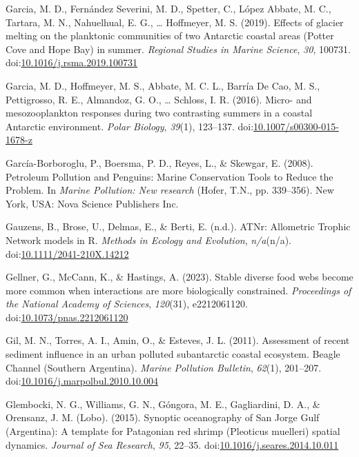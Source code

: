 \documentclass[
]{article}
\newlength{\cslhangindent}
\newlength{\cslentryspacingunit} %
\newenvironment{CSLReferences}[2] %
 {%
  \setlength{\parindent}{0pt}
  \ifodd #1
  \let\oldpar\par
  \def\par{\hangindent=\cslhangindent\oldpar}
  \fi
  \setlength{\parskip}{#2\cslentryspacingunit}
 }%
 {}
\begin{document}
\begin{CSLReferences}{1}{0}
\leavevmode{}%
Garcia, M. D., Fernández Severini, M. D., Spetter, C., López Abbate, M.
C., Tartara, M. N., Nahuelhual, E. G., \ldots{} Hoffmeyer, M. S. (2019).
Effects of glacier melting on the planktonic communities of two
{Antarctic} coastal areas ({Potter Cove} and {Hope Bay}) in summer.
\emph{Regional Studies in Marine Science}, \emph{30}, 100731.
doi:\href{https://doi.org/10.1016/j.rsma.2019.100731}{10.1016/j.rsma.2019.100731}

\leavevmode{}%
Garcia, M. D., Hoffmeyer, M. S., Abbate, M. C. L., Barría De Cao, M. S.,
Pettigrosso, R. E., Almandoz, G. O., \ldots{} Schloss, I. R. (2016).
Micro- and mesozooplankton responses during two contrasting summers in a
coastal {Antarctic} environment. \emph{Polar Biology}, \emph{39}(1),
123--137.
doi:\href{https://doi.org/10.1007/s00300-015-1678-z}{10.1007/s00300-015-1678-z}

\leavevmode{}%
García-Borboroglu, P., Boersma, P. D., Reyes, L., \& Skewgar, E. (2008).
Petroleum {Pollution} and {Penguins}: {Marine Conservation Tools} to
{Reduce} the {Problem}. In \emph{Marine {Pollution}: {New} research}
(Hofer, T.N., pp. 339--356). {New York, USA}: {Nova Science Publishers
Inc.}

\leavevmode{}%
Gauzens, B., Brose, U., Delmas, E., \& Berti, E. (n.d.). {ATNr}:
{Allometric Trophic Network} models in {R}. \emph{Methods in Ecology and
Evolution}, \emph{n/a}(n/a).
doi:\href{https://doi.org/10.1111/2041-210X.14212}{10.1111/2041-210X.14212}

\leavevmode{}%
Gellner, G., McCann, K., \& Hastings, A. (2023). Stable diverse food
webs become more common when interactions are more biologically
constrained. \emph{Proceedings of the National Academy of Sciences},
\emph{120}(31), e2212061120.
doi:\href{https://doi.org/10.1073/pnas.2212061120}{10.1073/pnas.2212061120}

\leavevmode{}%
Gil, M. N., Torres, A. I., Amin, O., \& Esteves, J. L. (2011).
Assessment of recent sediment influence in an urban polluted
subantarctic coastal ecosystem. {Beagle Channel} ({Southern Argentina}).
\emph{Marine Pollution Bulletin}, \emph{62}(1), 201--207.
doi:\href{https://doi.org/10.1016/j.marpolbul.2010.10.004}{10.1016/j.marpolbul.2010.10.004}

\leavevmode{}%
Glembocki, N. G., Williams, G. N., Góngora, M. E., Gagliardini, D. A.,
\& Orensanz, J. M. (Lobo). (2015). Synoptic oceanography of {San Jorge
Gulf} ({Argentina}): {A} template for {Patagonian} red shrimp
({Pleoticus} muelleri) spatial dynamics. \emph{Journal of Sea Research},
\emph{95}, 22--35.
doi:\href{https://doi.org/10.1016/j.seares.2014.10.011}{10.1016/j.seares.2014.10.011}


\end{CSLReferences}
\end{document}

